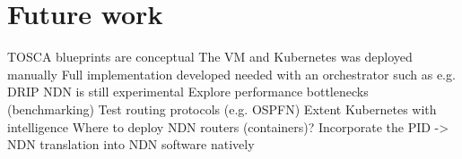 \section{Future work}
TOSCA blueprints are conceptual
The VM and Kubernetes was deployed manually
Full implementation developed needed with an orchestrator such as e.g. DRIP
NDN is still experimental
Explore performance bottlenecks (benchmarking)
Test routing protocols (e.g. OSPFN)
Extent Kubernetes with intelligence
Where to deploy NDN routers (containers)?
Incorporate the PID -> NDN translation into NDN software natively